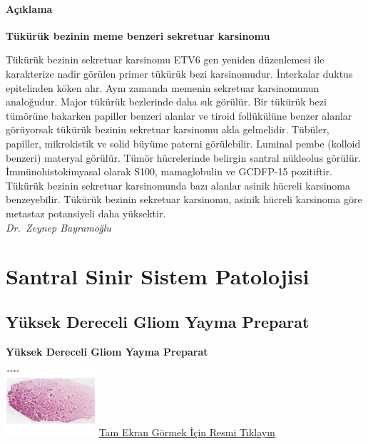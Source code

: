 \documentclass[
  letterpaper,
  DIV=11,
  numbers=noendperiod]{scrreprt}
\begin{document}
\hypertarget{auxe7ux131klama}{%
\subsection{Açıklama}\label{auxe7ux131klama}}

\textbf{Tükürük bezinin meme benzeri sekretuar karsinomu}

Tükürük bezinin sekretuar karsinomu ETV6 gen yeniden düzenlemesi ile
karakterize nadir görülen primer tükürük bezi karsinomudur. İnterkalar
duktus epitelinden köken alır. Aynı zamanda memenin sekretuar
karsinomunun analoğudur. Major tükürük bezlerinde daha sık görülür. Bir
tükürük bezi tümörüne bakarken papiller benzeri alanlar ve tiroid
follükülüne benzer alanlar görüyorsak tükürük bezinin sekretuar
karsinomu akla gelmelidir. Tübüler, papiller, mikrokistik ve solid
büyüme paterni görülebilir. Luminal pembe (kolloid benzeri) materyal
görülür. Tümör hücrelerinde belirgin santral nükleolus görülür.
İmmünohistokimyasal olarak S100, mamaglobulin ve GCDFP-15 pozitiftir.
Tükürük bezinin sekretuar karsinomunda bazı alanlar asinik hücreli
karsinoma benzeyebilir. Tükürük bezinin sekretuar karsinomu, asinik
hücreli karsinoma göre metastaz potansiyeli daha yüksektir.\\
\emph{Dr.~Zeynep Bayramoğlu}

\part{Santral Sinir Sistem Patolojisi}

\hypertarget{sec-yuksek-dereceli-gliom-yayma-preparat}{%
\chapter{Yüksek Dereceli Gliom Yayma
Preparat}\label{sec-yuksek-dereceli-gliom-yayma-preparat}}

\textbf{Yüksek Dereceli Gliom Yayma Preparat}

\href{https://images.patolojiatlasi.com/high-grade-glioma-squash/HE.html}{\includegraphics[width=0.25\textwidth,height=\textheight]{./screenshots/thumbnail_high-grade-glioma-squash.png}}
\href{https://images.patolojiatlasi.com/high-grade-glioma-squash/HE.html}{Tam
Ekran Görmek İçin Resmi Tıklayın}
\end{document}
